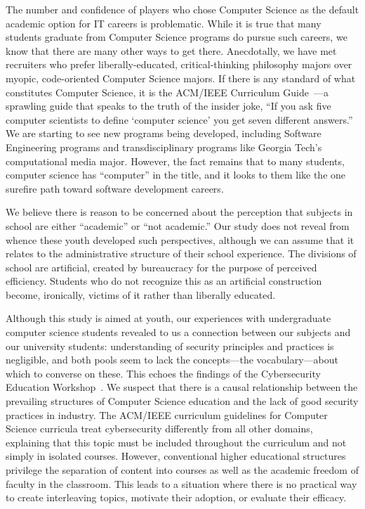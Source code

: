 \documentclass[letterpaper]{article}
\begin{document}
The number and confidence of players who chose Computer Science
as the default academic option for IT careers is problematic.
While it is true that many students graduate from Computer Science
programs do pursue such careers, we know that there are many other
ways to get there. Anecdotally, we have met recruiters who prefer
liberally-educated, critical-thinking philosophy majors over 
myopic, code-oriented Computer Science majors.
If there is any standard of what constitutes Computer Science,
it is the ACM/IEEE Curriculum Guide~\citep{CS2013}---a sprawling
guide that speaks to the truth of the insider joke, ``If you ask
five computer scientists to define `computer science' you get
seven different answers.''
We are starting to see new programs being developed, including
Software Engineering programs and transdisciplinary programs like
Georgia Tech's computational media major. However, the fact remains
that to many students, computer science has ``computer'' in the title,
and it looks to them like the one surefire path toward software
development careers.

We believe there is reason to be concerned about the perception that
subjects in school are either ``academic'' or ``not academic.''
Our study does not reveal from whence these youth developed
such perspectives, although we can assume that it relates to the
administrative structure of their school experience.
The divisions of school are artificial, created by bureaucracy for
the purpose of perceived efficiency.
Students who do not recognize this as an artificial construction 
become, ironically, victims of it rather than liberally educated.

Although this study is aimed at youth, our experiences with
undergraduate computer science students revealed to us a connection
between our subjects and our university students: 
understanding of security principles and practices is negligible, 
and both pools seem to lack the concepts---the vocabulary---about
which to converse on these. This echoes the findings of the 
Cybersecurity Education Workshop~\citep{Cybersecurity2014}.
We suspect that there is a causal relationship between the
prevailing structures of Computer Science education and the lack
of good security practices in industry. The ACM/IEEE curriculum
guidelines for Computer Science curricula treat cybersecurity differently
from all other domains, explaining that this topic must be included
throughout the curriculum and not simply in isolated courses.
However, conventional higher educational structures privilege the
separation of content into courses as well as the academic freedom
of faculty in the classroom. This leads to a situation where there is
no practical way to create interleaving topics, motivate their adoption,
or evaluate their efficacy. 
\end{document}
